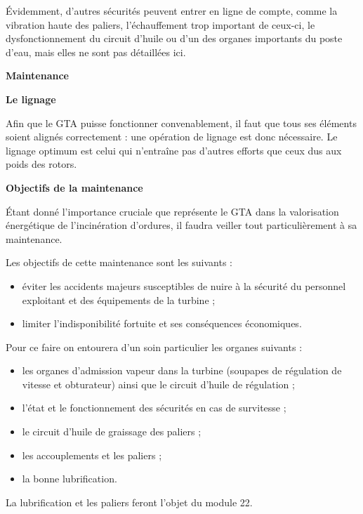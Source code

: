 Évidemment, d’autres sécurités peuvent entrer en ligne de compte, comme la vibration haute des paliers, l’échauffement trop important de ceux-ci, le dysfonctionnement du circuit d’huile ou d’un des organes importants du poste d’eau, mais elles ne sont pas détaillées ici.

\vspace{0.3cm}
\textbf{Maintenance}
\vspace{0.3cm}

\vspace{0.3cm}
\textbf{Le lignage}
\vspace{0.3cm}

Afin que le GTA puisse fonctionner convenablement, il faut que tous ses éléments soient alignés correctement : une opération de lignage est donc nécessaire.
Le lignage optimum est celui qui n’entraîne pas d’autres efforts que ceux dus aux poids des rotors.


\vspace{0.3cm}
\textbf{Objectifs de la maintenance}
\vspace{0.3cm}

Étant donné l’importance cruciale que représente le GTA dans la valorisation énergétique de l’incinération d’ordures, il faudra veiller tout particulièrement à sa maintenance.
\vspace{0.3cm}

Les objectifs de cette maintenance sont les suivants :

\begin{itemize}
\item éviter les accidents majeurs susceptibles de nuire à la sécurité du personnel exploitant et des équipements de la turbine ;
\item limiter l’indisponibilité fortuite et ses conséquences économiques.

\end{itemize} 
Pour ce faire on entourera d’un soin particulier les organes suivants :

\begin{itemize}

\item les organes d’admission vapeur dans la turbine (soupapes de régulation de vitesse et obturateur) ainsi que le circuit d’huile de régulation ;
\item l’état et le fonctionnement des sécurités en cas de survitesse ;
\item le circuit d’huile de graissage des paliers ;
\item les accouplements et les paliers ;
\item la bonne lubrification.

\end{itemize}
La lubrification et les paliers feront l’objet du module 22.

